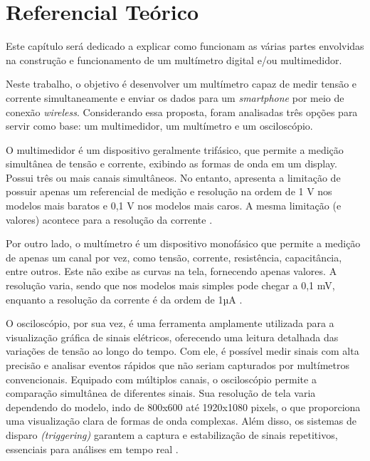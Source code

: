 \chapter{Referencial Teórico}\label{cap:referencialTeorico}

Este capítulo será dedicado a explicar como funcionam as várias partes envolvidas na construção e funcionamento de um multímetro digital e/ou multimedidor.

Neste trabalho, o objetivo é desenvolver um multímetro capaz de medir tensão e corrente simultaneamente e enviar os dados para um \textit{smartphone} por meio de conexão \textit{wireless}. Considerando essa proposta, foram analisadas três opções para servir como base: um multimedidor, um multímetro e um osciloscópio.

O multimedidor é um dispositivo geralmente trifásico, que permite a medição simultânea de tensão e corrente, exibindo as formas de onda em um display. Possui três ou mais canais simultâneos. No entanto, apresenta a limitação de possuir apenas um referencial de medição e resolução na ordem de 1 V nos modelos mais baratos e 0,1 V nos modelos mais caros. A mesma limitação (e valores) acontece para a resolução da corrente \cite{fluke434}.

Por outro lado, o multímetro é um dispositivo monofásico que permite a medição de apenas um canal por vez, como tensão, corrente, resistência, capacitância, entre outros. Este não exibe as curvas na tela, fornecendo apenas valores. A resolução varia, sendo que nos modelos mais simples pode chegar a 0,1 mV, enquanto a resolução da corrente é da ordem de 1µA \cite{et1100}.

O osciloscópio, por sua vez, é uma ferramenta amplamente utilizada para a visualização gráfica de sinais elétricos, oferecendo uma leitura detalhada das variações de tensão ao longo do tempo. Com ele, é possível medir sinais com alta precisão e analisar eventos rápidos que não seriam capturados por multímetros convencionais. Equipado com múltiplos canais, o osciloscópio permite a comparação simultânea de diferentes sinais. Sua resolução de tela varia dependendo do modelo, indo de 800x600 até 1920x1080 pixels, o que proporciona uma visualização clara de formas de onda complexas. Além disso, os sistemas de disparo \textit{(triggering)} garantem a captura e estabilização de sinais repetitivos, essenciais para análises em tempo real \cite{keysight-oscilloscope-guide}.

